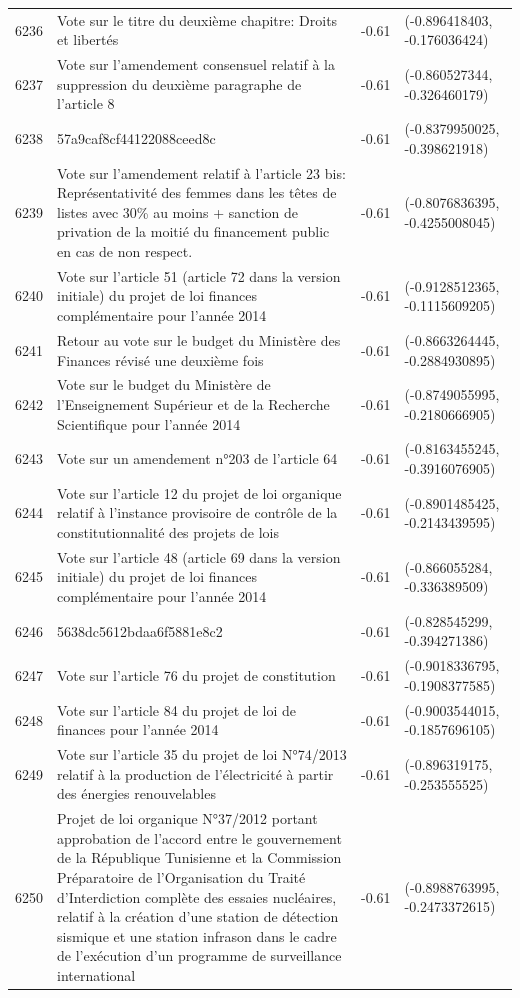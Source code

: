 \begin{table}[ht]
\begin{tabular}{rlrl}
  6236 & Vote sur le titre du deuxième chapitre: Droits et libertés & -0.61 & (-0.896418403, -0.176036424) \\ 
  6237 & Vote sur l'amendement consensuel relatif à la suppression du deuxième paragraphe de l'article 8 & -0.61 & (-0.860527344, -0.326460179) \\ 
  6238 & 57a9caf8cf44122088ceed8c & -0.61 & (-0.8379950025, -0.398621918) \\ 
  6239 & Vote sur l'amendement relatif à l'article 23 bis: Représentativité des femmes dans les têtes de listes avec 30\% au moins + sanction de privation de la moitié du financement public en cas de non respect. & -0.61 & (-0.8076836395, -0.4255008045) \\ 
  6240 & Vote sur l'article 51 (article 72 dans la version initiale) du projet de loi finances complémentaire pour l'année 2014 & -0.61 & (-0.9128512365, -0.1115609205) \\ 
  6241 & Retour au vote sur le budget du Ministère des Finances révisé une deuxième fois & -0.61 & (-0.8663264445, -0.2884930895) \\ 
  6242 & Vote sur le budget du Ministère de l'Enseignement Supérieur et de la Recherche Scientifique pour l'année 2014 & -0.61 & (-0.8749055995, -0.2180666905) \\ 
  6243 & Vote sur un amendement n°203 de l'article 64 & -0.61 & (-0.8163455245, -0.3916076905) \\ 
  6244 & Vote sur l'article 12 du projet de loi organique relatif à l'instance provisoire de contrôle de la constitutionnalité des projets de lois & -0.61 & (-0.8901485425, -0.2143439595) \\ 
  6245 & Vote sur l'article 48 (article 69 dans la version initiale) du projet de loi finances complémentaire pour l'année 2014 & -0.61 & (-0.866055284, -0.336389509) \\ 
  6246 & 5638dc5612bdaa6f5881e8c2 & -0.61 & (-0.828545299, -0.394271386) \\ 
  6247 & Vote sur l'article 76 du projet de constitution & -0.61 & (-0.9018336795, -0.1908377585) \\ 
  6248 & Vote sur l'article 84 du projet de loi de finances pour l'année 2014 & -0.61 & (-0.9003544015, -0.1857696105) \\ 
  6249 & Vote sur l'article 35 du projet de loi N°74/2013 relatif à la production de l'électricité à partir des énergies renouvelables & -0.61 & (-0.896319175, -0.253555525) \\ 
  6250 & Projet de loi organique N°37/2012 portant approbation de l'accord entre le gouvernement de la République Tunisienne et la Commission Préparatoire de l'Organisation du Traité d'Interdiction complète des essaies nucléaires, relatif à la création d'une station de détection sismique et une station infrason dans le cadre de l'exécution d'un programme de surveillance international & -0.61 & (-0.8988763995, -0.2473372615) \\ 

\end{tabular}
\end{table}
